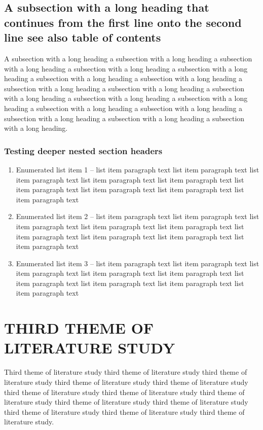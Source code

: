 \subsection{A subsection with a long heading that continues from the
  first line onto the second line see also table of contents}

A subsection with a long heading a subsection with a long heading a
subsection with a long heading a subsection with a long heading a
subsection with a long heading a subsection with a long heading a
subsection with a long heading a subsection with a long heading a
subsection with a long heading a subsection with a long heading a
subsection with a long heading a subsection with a long heading a
subsection with a long heading a subsection with a long heading a
subsection with a long heading a subsection with a long heading a
subsection with a long heading.

\subsubsection{Testing deeper nested section headers}

\begin{enumerate}
\item Enumerated list item 1 -- list item paragraph text list item paragraph
    text list item paragraph text list item paragraph text list item
    paragraph text list item paragraph text list item paragraph text
    list item paragraph text list item paragraph text
\item Enumerated list item 2 -- list item paragraph text list item paragraph
    text list item paragraph text list item paragraph text list item
    paragraph text list item paragraph text list item paragraph text
    list item paragraph text list item paragraph text
\item Enumerated list item 3 -- list item paragraph text list item paragraph
    text list item paragraph text list item paragraph text list item
    paragraph text list item paragraph text list item paragraph text
    list item paragraph text list item paragraph text
\end{enumerate}

\section{THIRD THEME OF LITERATURE STUDY}

Third theme of literature study third theme of literature study third
theme of literature study third theme of literature study third theme
of literature study third theme of literature study third theme of
literature study third theme of literature study third theme of
literature study third theme of literature study third theme of
literature study third theme of literature study third theme of
literature study.


